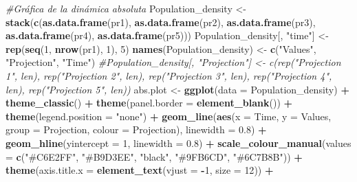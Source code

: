 \documentclass[
]{book}
\newenvironment{Shaded}{\begin{snugshade}}{\end{snugshade}}
\newcommand{\AttributeTok}[1]{\textcolor[rgb]{0.13,0.29,0.53}{#1}}
\newcommand{\CommentTok}[1]{\textcolor[rgb]{0.56,0.35,0.01}{\textit{#1}}}
\newcommand{\DecValTok}[1]{\textcolor[rgb]{0.00,0.00,0.81}{#1}}
\newcommand{\FloatTok}[1]{\textcolor[rgb]{0.00,0.00,0.81}{#1}}
\newcommand{\FunctionTok}[1]{\textcolor[rgb]{0.13,0.29,0.53}{\textbf{#1}}}
\newcommand{\NormalTok}[1]{#1}
\newcommand{\OtherTok}[1]{\textcolor[rgb]{0.56,0.35,0.01}{#1}}
\newcommand{\SpecialCharTok}[1]{\textcolor[rgb]{0.81,0.36,0.00}{\textbf{#1}}}
\newcommand{\StringTok}[1]{\textcolor[rgb]{0.31,0.60,0.02}{#1}}
\theoremstyle{definition}
\theoremstyle{definition}
\theoremstyle{definition}
\theoremstyle{definition}
\theoremstyle{remark}
\begin{document}
\begin{Shaded}
\begin{Highlighting}[]
\CommentTok{\#Gráfica de la dinámica absoluta }
\NormalTok{Population\_density }\OtherTok{\textless{}{-}} \FunctionTok{stack}\NormalTok{(}\FunctionTok{c}\NormalTok{(}\FunctionTok{as.data.frame}\NormalTok{(pr1), }\FunctionTok{as.data.frame}\NormalTok{(pr2), }\FunctionTok{as.data.frame}\NormalTok{(pr3), }\FunctionTok{as.data.frame}\NormalTok{(pr4), }\FunctionTok{as.data.frame}\NormalTok{(pr5)))}
\NormalTok{Population\_density[, }\StringTok{"time"}\NormalTok{] }\OtherTok{\textless{}{-}} \FunctionTok{rep}\NormalTok{(}\FunctionTok{seq}\NormalTok{(}\DecValTok{1}\NormalTok{, }\FunctionTok{nrow}\NormalTok{(pr1), }\DecValTok{1}\NormalTok{), }\DecValTok{5}\NormalTok{)}
\FunctionTok{names}\NormalTok{(Population\_density) }\OtherTok{\textless{}{-}} \FunctionTok{c}\NormalTok{(}\StringTok{"Values"}\NormalTok{, }\StringTok{"Projection"}\NormalTok{, }\StringTok{"Time"}\NormalTok{)}
\CommentTok{\#Population\_density[, "Projection"] \textless{}{-} c(rep("Projection 1", len), rep("Projection 2", len), rep("Projection 3", len), rep("Projection 4", len), rep("Projection 5", len))}
\NormalTok{abs.plot }\OtherTok{\textless{}{-}} \FunctionTok{ggplot}\NormalTok{(}\AttributeTok{data =}\NormalTok{ Population\_density) }\SpecialCharTok{+}
\FunctionTok{theme\_classic}\NormalTok{() }\SpecialCharTok{+}
\FunctionTok{theme}\NormalTok{(}\AttributeTok{panel.border =} \FunctionTok{element\_blank}\NormalTok{()) }\SpecialCharTok{+}
\FunctionTok{theme}\NormalTok{(}\AttributeTok{legend.position =} \StringTok{"none"}\NormalTok{) }\SpecialCharTok{+}
\FunctionTok{geom\_line}\NormalTok{(}\FunctionTok{aes}\NormalTok{(}\AttributeTok{x =}\NormalTok{ Time, }\AttributeTok{y =}\NormalTok{ Values, }\AttributeTok{group =}\NormalTok{ Projection, }\AttributeTok{colour =}\NormalTok{ Projection), }\AttributeTok{linewidth =} \FloatTok{0.8}\NormalTok{) }\SpecialCharTok{+}
\FunctionTok{geom\_hline}\NormalTok{(}\AttributeTok{yintercept =} \DecValTok{1}\NormalTok{, }\AttributeTok{linewidth =} \FloatTok{0.8}\NormalTok{) }\SpecialCharTok{+}
\FunctionTok{scale\_colour\_manual}\NormalTok{(}\AttributeTok{values =} \FunctionTok{c}\NormalTok{(}\StringTok{"\#C6E2FF"}\NormalTok{, }\StringTok{"\#B9D3EE"}\NormalTok{, }\StringTok{"black"}\NormalTok{, }\StringTok{"\#9FB6CD"}\NormalTok{, }\StringTok{"\#6C7B8B"}\NormalTok{)) }\SpecialCharTok{+}
\FunctionTok{theme}\NormalTok{(}\AttributeTok{axis.title.x =} \FunctionTok{element\_text}\NormalTok{(}\AttributeTok{vjust =} \SpecialCharTok{{-}}\DecValTok{1}\NormalTok{, }\AttributeTok{size =} \DecValTok{12}\NormalTok{)) }\SpecialCharTok{+}

\end{Highlighting}
\end{Shaded}
\end{document}
